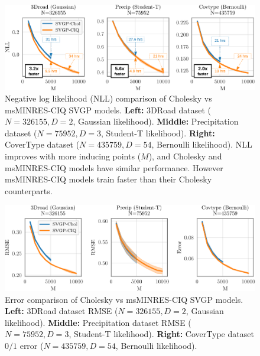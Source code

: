 \begin{figure}[t!]
  \centering
  \includegraphics[width=\linewidth]{figures/variational_nll.pdf}
  \caption[Negative log likelihood (NLL) comparison of Cholesky vs msMINRES-CIQ SVGP models.]{
    Negative log likelihood (NLL) comparison of Cholesky vs msMINRES-CIQ SVGP models.
    {\bf Left:} 3DRoad dataset ($N=326155, D=2$, Gaussian likelihood).
    {\bf Middle:} Precipitation dataset ($N=75952, D=3$, Student-T likelihood).
    {\bf Right:} CoverType dataset ($N=435759, D=54$, Bernoulli likelihood).
    NLL improves with more inducing points ($M$), and Cholesky and msMINRES-CIQ models have similar performance.
    However msMINRES-CIQ models train faster than their Cholesky counterparts.
  }
  \label{fig:variational_nll}
\end{figure}

\begin{figure}[t!]
  \centering
  \includegraphics[width=\linewidth]{figures/variational_error.pdf}
  \caption[Error comparison of Cholesky vs msMINRES-CIQ SVGP models.]{
    Error comparison of Cholesky vs msMINRES-CIQ SVGP models.
    {\bf Left:} 3DRoad dataset RMSE ($N=326155, D=2$, Gaussian likelihood).
    {\bf Middle:} Precipitation dataset RMSE ($N=75952, D=3$, Student-T likelihood).
    {\bf Right:} CoverType dataset $0/1$ error ($N=435759, D=54$, Bernoulli likelihood).
  }
  \label{fig:variational_error}
\end{figure}

